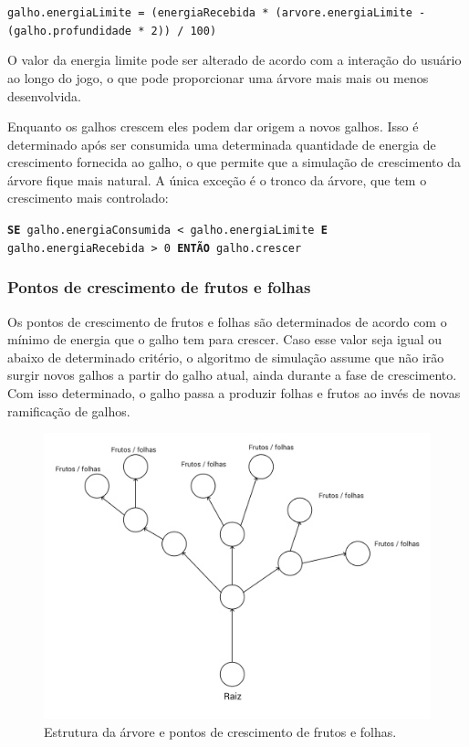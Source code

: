 \documentclass[12pt]{article}
\begin{document}
  \texttt{\footnotesize{galho.energiaLimite = (energiaRecebida * (arvore.energiaLimite - (galho.profundidade * 2)) / 100)}}

O valor da energia limite pode
ser alterado de acordo com a intera\c c\~ao do usu\'ario ao longo do jogo, o que pode proporcionar uma \'arvore mais
mais ou menos desenvolvida.

Enquanto os galhos crescem eles podem dar origem a novos galhos. Isso \'e determinado ap\'os ser consumida uma determinada
quantidade de energia de crescimento fornecida ao galho, o que permite que a simula\c c\~ao de crescimento da \'arvore
fique mais natural. A \'unica exce\c c\~ao \'e o tronco da \'arvore, que tem o crescimento
mais controlado:

\texttt{\footnotesize{\textbf{SE} galho.energiaConsumida < galho.energiaLimite \textbf{E} galho.energiaRecebida > 0
\textbf{ENT\~AO} galho.crescer}}

\subsubsection{Pontos de crescimento de frutos e folhas}
Os pontos de crescimento de frutos e folhas s\~ao determinados de acordo com o m\'inimo de energia que o galho
tem para crescer. Caso esse valor seja igual ou abaixo de determinado crit\'erio, o algoritmo de simula\c c\~ao assume
que n\~ao ir\~ao surgir novos galhos a partir do galho atual, ainda durante a fase de crescimento. Com isso determinado,
o galho passa a produzir folhas e frutos ao inv\'es de novas ramifica\c c\~ao de galhos.

	\begin{figure}[ht!]
	\begin{center}
		\includegraphics[scale=0.15]{img/PI3_Arvore.png}
		\caption{\footnotesize {Estrutura da \'arvore e pontos de crescimento de frutos e folhas.} }
	\end{center}
	\end{figure}	
\end{document}
